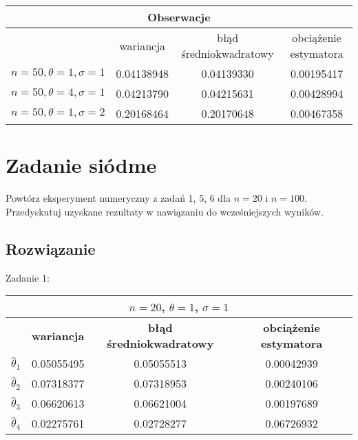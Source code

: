 \documentclass[a4paper]{article}
\begin{document}
\begin{table}[H]
\centering
\begin{tabular}{|c|c|c|c|}
\hline
\multicolumn{4}{|c|}{\textbf{Obserwacje}}                                                       \\ \hline
         & wariancja           & błąd średniokwadratowy & obciążenie estymatora \\ \hline
$n=50,\theta=1,\sigma=1$ & 0.04138948 & 0.04139330 & 0.00195417 \\ \hline
$n=50,\theta=4,\sigma=1$ & 0.04213790 & 0.04215631 & 0.00428994 \\ \hline
$n=50,\theta=1,\sigma=2$ & 0.20168464 & 0.20170648 & 0.00467358 \\ \hline
\end{tabular}
\end{table}



\section{Zadanie siódme}
Powtórz eksperyment numeryczny z zadań 1, 5, 6 dla $n=20$ i $n=100$. Przedyskutuj uzyskane rezultaty w nawiązaniu do wcześniejszych wyników.

\subsection{Rozwiązanie}
Zadanie 1:

\begin{table}[H]
\centering
\begin{tabular}{|c|c|c|c|}
\hline
\multicolumn{4}{|c|}{$n=20$, $\theta=1$, $\sigma=1$} \\ \hline
                  & \textbf{wariancja}   & \textbf{błąd średniokwadratowy} & \textbf{obciążenie estymatora} \\ \hline
$\hat{\theta}_1$ & 0.05055495 & 0.05055513 & 0.00042939 \\ \hline
$\hat{\theta}_2$ & 0.07318377 & 0.07318953 & 0.00240106 \\ \hline
$\hat{\theta}_3$ & 0.06620613 & 0.06621004 & 0.00197689 \\ \hline
$\hat{\theta}_4$ & 0.02275761 & 0.02728277 & 0.06726932 \\ \hline
\end{tabular}
\end{table}
\end{document}
